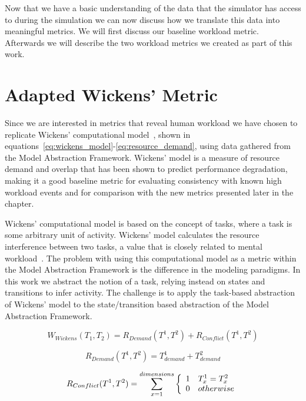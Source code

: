 Now that we have a basic understanding of the data that the simulator has access to during the simulation we can now discuss how we translate this data into meaningful metrics.  We will first discuss our baseline workload metric.  Afterwards we will describe the two workload metrics we created as part of this work.


\section{Adapted Wickens' Metric}
Since we are interested in metrics that reveal human workload we have chosen to replicate Wickens' computational model~\cite{wickens2002multiple}, shown in equations~\ref{eq:wickens_model}-\ref{eq:resource_demand}, using data gathered from the Model Abstraction Framework.  Wickens' model is a measure of resource demand and overlap that has been shown to predict performance degradation, making it a good baseline metric for evaluating consistency with known high workload events and for comparison with the new metrics presented later in the chapter.  

Wickens' computational model is based on the concept of tasks, where a task is some arbitrary unit of activity.  Wickens' model calculates the resource interference between two tasks, a value that is closely related to mental workload~\cite{wickens2002multiple}.  The problem with using this computational model as a metric within the Model Abstraction Framework is the difference in the modeling paradigms.  In this work we abstract the notion of a task, relying instead on states and transitions to infer activity.  The challenge is to apply the task-based abstraction of Wickens' model to the state/transition based abstraction of the Model Abstraction Framework.

\begin{equation}
  W_{Wickens}(T_{1}, T_{2}) = R_{Demand}(T^{1}, T^{2}) + R_{Conflict}(T^{1}, T^{2})
  \label{eq:wickens_model}
\end{equation}

\begin{equation}
  R_{Demand}(T^{1}, T^{2}) = T_{demand}^{1} + T_{demand}^{2}
  \label{eq:resource_demand}
\end{equation}

\begin{equation}
  R_{Conflict}(T^{1}, T^{2}) = \sum_{x=1}^{dimensions} \left\{
    \begin{array}{l l}
      1 & T_{x}^{1} = T_{x}^{2} \\
      0 & otherwise \\
    \end{array}
    \right.
  \label{eq:resource_conflict}
\end{equation}

